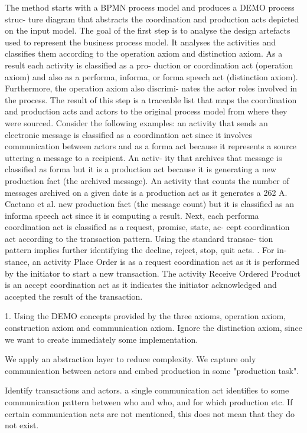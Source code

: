 \documentclass[]{article}
\begin{document}
The method starts with a BPMN process model and produces a DEMO process struc- ture diagram that abstracts the coordination and production acts depicted on the input model. The goal of the first step is to analyse the design artefacts used to represent the business process model. It analyses the activities and classifies them according to the operation axiom and distinction axiom. As a result each activity is classified as a pro- duction or coordination act (operation axiom) and also as a performa, informa, or forma speech act (distinction axiom). Furthermore, the operation axiom also discrimi- nates the actor roles involved in the process. The result of this step is a traceable list that maps the coordination and production acts and actors to the original process model from where they were sourced.
Consider the following examples: an activity that sends an electronic message is classified as a coordination act since it involves communication between actors and as a forma act because it represents a source uttering a message to a recipient. An activ- ity that archives that message is classified as forma but it is a production act because it is generating a new production fact (the archived message). An activity that counts the number of messages archived on a given date is a production act as it generates a
262 A. Caetano et al.
new production fact (the message count) but it is classified as an informa speech act since it is computing a result.
Next, each performa coordination act is classified as a request, promise, state, ac- cept coordination act according to the transaction pattern. Using the standard transac- tion pattern implies further identifying the decline, reject, stop, quit acts. . For in- stance, an activity Place Order is as a request coordination act as it is performed by the initiator to start a new transaction. The activity Receive Ordered Product is an accept coordination act as it indicates the initiator acknowledged and accepted the result of the transaction.

1.
Using the DEMO concepts provided by the three axioms,
operation axiom, construction axiom and communication axiom.
Ignore the distinction axiom, since we want to create immediately some
implementation. 

We apply an abstraction layer to reduce complexity. We capture only
communication between actors and embed production in some "production task".

Identify transactions and actors.
a single communication act identifies to some communication pattern between
who and who, and for which production etc.
If certain communication acts are not mentioned, this does not mean that they do not exist.
\end{document}
